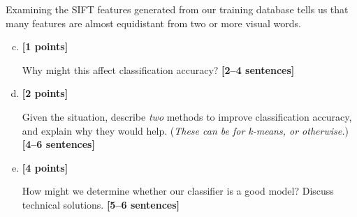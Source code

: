Examining the SIFT features generated from our training database tells us that many features are almost equidistant from two or more visual words.

\begin{enumerate}[(a)]
    \setcounter{enumi}{2}
    \item \textbf{[1 points]}
    \begin{tcolorbox}[colback=orange!5!white,colframe=orange!75!black]
      Why might this affect classification accuracy? \textbf{[2--4 sentences]}
    \end{tcolorbox}
    
    

    \item \textbf{[2 points]} 
    \begin{tcolorbox}[colback=orange!5!white,colframe=orange!75!black]
     Given the situation, describe \emph{two} methods to improve classification accuracy, and explain why they would help. (\emph{These can be for k-means, or otherwise.}) \textbf{[4--6 sentences]}
    \end{tcolorbox}
    
    

    \pagebreak
    \item \textbf{[4 points]} 
    \begin{tcolorbox}[colback=orange!5!white,colframe=orange!75!black]
        How might we determine whether our classifier is a good model? Discuss technical solutions. \textbf{[5--6 sentences]}
    \end{tcolorbox}


\end{enumerate}
